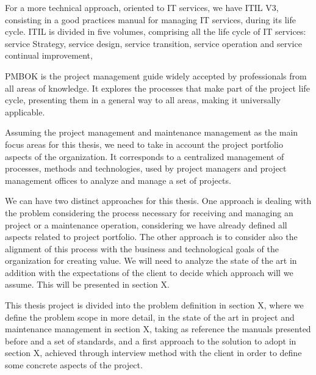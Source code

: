 For a more technical approach, oriented to IT services, we have ITIL V3, consisting in a good practices manual for managing IT services, during its life cycle. ITIL is divided in five volumes, comprising all the life cycle of IT services: service Strategy, service design, service transition, service operation and service continual improvement,\par
PMBOK is the project management guide widely accepted by professionals from all areas of knowledge. It explores the processes that make part of the project life cycle, presenting them in a general way to all areas, making it universally applicable.\par
Assuming the project management and maintenance management as the main focus areas for this thesis, we need to take in account the project portfolio aspects of the organization. It corresponds to a centralized management of processes, methods and technologies, used by project managers and project management offices to analyze and manage a set of projects.\par
We can have two distinct approaches for this thesis. One approach is dealing with the problem considering the process necessary for receiving and managing an project or a maintenance operation, considering we have already defined all aspects related to project portfolio. The other approach is to consider also the alignment of this process with the business and technological goals of the organization for creating value. We will need to analyze the state of the art in addition with the expectations of the client to decide which approach will we assume. This will be presented in section X.\par
This thesis project is divided into the problem definition in section X, where we define the problem scope in more detail, in the state of the art in project and maintenance management in section X, taking as reference the manuals presented before and a set of standards, and a first approach to the solution to adopt in section X,  achieved through interview method with the client in order to define some concrete aspects of the project.